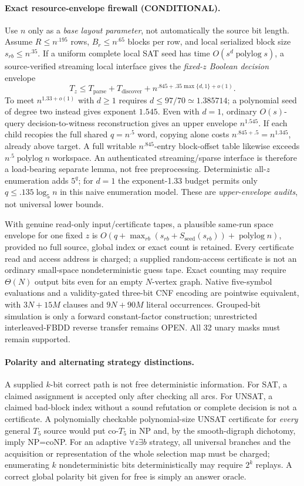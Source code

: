 \documentclass[11pt]{article}
\begin{document}
\paragraph{Exact resource-envelope firewall (CONDITIONAL).}
Use $n$ only as a \emph{base layout parameter}, not automatically the
source bit length. Assume $R\le n^{.195}$ rows,
$B_r\le n^{.65}$ blocks per row, and local serialized block size
$s_{rb}\le n^{.35}$. If a uniform complete local SAT seed has
time $O(s^d\operatorname{polylog}s)$, a source-verified streaming
local interface gives the \emph{fixed-$z$ Boolean decision} envelope
\[
 T_z\le T_{\mathrm{parse}}+T_{\mathrm{discover}}
       +n^{.845+.35\max\{d,1\}+o(1)}.
\]
To meet $n^{1.33+o(1)}$ with $d\ge1$ requires
$d\le97/70\simeq1.385714$; a polynomial seed of degree two instead
gives exponent $1.545$. Even with $d=1$, ordinary $O(s)$-query
decision-to-witness reconstruction gives an upper envelope $n^{1.545}$.
If each child recopies the full shared $q=n^{.5}$ word, copying alone
costs $n^{.845+.5}=n^{1.345}$, already above target.
A full writable $n^{.845}$-entry block-offset table likewise exceeds
$n^{.5}\operatorname{polylog}n$ workspace. An authenticated
streaming/sparse interface is therefore a load-bearing separate lemma,
not free preprocessing. Deterministic all-$z$ enumeration adds $5^q$;
for $d=1$ the exponent-1.33 budget permits only
$q\le .135\log_5 n$ in this naive enumeration model.
These are \emph{upper-envelope audits}, not universal lower bounds.

With genuine read-only input/certificate tapes, a plausible same-run
space envelope for one fixed $z$ is
$O(q+\max_{rb}(s_{rb}+S_{\mathrm{seed}}(s_{rb}))
+\operatorname{polylog}n)$, provided no full source, global index
or exact count is retained. Every certificate read and access address
is charged; a supplied random-access certificate is not an ordinary
small-space nondeterministic guess tape. Exact counting may require
$\Theta(N)$ output bits even for an empty $N$-vertex graph.
Native five-symbol evaluations and a validity-gated three-bit CNF
encoding are pointwise equivalent, with $3N+15M$ clauses and
$9N+90M$ literal occurrences. Grouped-bit simulation is only a forward
constant-factor construction; unrestricted interleaved-FBDD reverse
transfer remains OPEN. All 32 unary masks must remain supported.

\paragraph{Polarity and alternating strategy distinctions.}
A supplied $k$-bit correct path is not free deterministic information.
For SAT, a claimed assignment is accepted only after checking all arcs.
For UNSAT, a claimed bad-block index without a sound refutation or
complete decision is not a certificate. A polynomially checkable
polynomial-size UNSAT certificate for \emph{every} general $T_5$ source
would put co-$T_5$ in NP and, by the smooth-digraph dichotomy,
imply NP=coNP. For an adaptive $\forall z\exists b$ strategy,
all universal branches and the acquisition or representation of
the whole selection map must be charged; enumerating $k$ nondeterministic
bits deterministically may require $2^k$ replays. A correct global
polarity bit given for free is simply an answer oracle.
\end{document}
